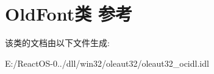 \hypertarget{class_old_font}{}\section{Old\+Font类 参考}
\label{class_old_font}


该类的文档由以下文件生成\+:\begin{DoxyCompactItemize}
\item 
E\+:/\+React\+O\+S-\/0../dll/win32/oleaut32/oleaut32\+\_\+ocidl.\+idl\end{DoxyCompactItemize}
